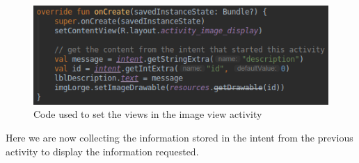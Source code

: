 \documentclass{scrartcl}
\begin{document}
\pagebreak

\begin{figure}[h]
    \centering
    \includegraphics[scale=0.6]{images/screen4.png}
    \caption{Code used to set the views in the image view activity}
\end{figure}

Here we are now collecting the information stored in the intent from the previous activity to
display the information requested.
\end{document}
